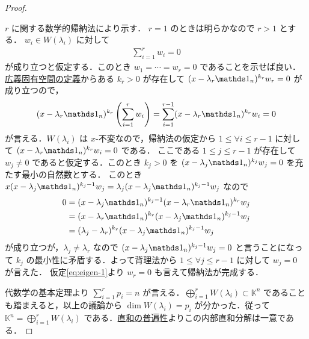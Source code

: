 \documentclass[rep_main]{subfiles}
\begin{document}
\begin{proof}
\begin{description}
        $r$ に関する数学的帰納法により示す．
        $r = 1$ のときは明らかなので $r > 1$ とする．
        $w_i \in W(\lambda_i)$ に対して
        \begin{align}
            \label{eq:eigen-1}
            \sum_{i=1}^r w_i = 0
        \end{align}
        が成り立つと仮定する．このとき $w_1 = \cdots = w_r = 0$ であることを示せば良い．
        \hyperref[def:eigen]{広義固有空間の定義}からある $k_r > 0$ が存在して $(x - \lambda_r \unity_n)^{k_r} w_r = 0$ が成り立つので，
        \begin{align}
            (x - \lambda_r \unity_n)^{k_r}\left(\sum_{i=1}^rw_i \right) = \sum_{i=1}^{r-1} (x - \lambda_r \unity_n)^{k_r}w_i = 0
        \end{align}
        が言える．$W(\lambda_i)$ は $x$-不変なので，帰納法の仮定から $1 \le \forall i \le r-1$ に対して $(x - \lambda_r \unity_n)^{k_r}w_i = 0$ である．
        ここである $1 \le j \le r-1$ が存在して $w_j \neq 0$ であると仮定する．このとき $k_j > 0$ を $(x - \lambda_j \unity_n)^{k_j} w_j = 0$ を充たす最小の自然数とする．
        このとき $x (x - \lambda_j \unity_n)^{k_j-1} w_j = \lambda_j (x - \lambda_j \unity_n)^{k_j-1} w_j$ なので
        \begin{align}
            0 
            &= (x - \lambda_j \unity_n)^{k_j-1} (x - \lambda_r \unity_n)^{k_r}w_j \\
            &= (x - \lambda_r \unity_n)^{k_r}(x - \lambda_j \unity_n)^{k_j-1} w_j \\
            &= (\lambda_j - \lambda_r)^{k_r}(x - \lambda_j \unity_n)^{k_j-1} w_j
        \end{align}
        が成り立つが，$\lambda_j \neq \lambda_r$ なので $(x - \lambda_j \unity_n)^{k_j-1} w_j = 0$ と言うことになって $k_j$ の最小性に矛盾する．よって背理法から $1 \le \forall j \le r-1$ に対して $w_j = 0$ が言えた．
        仮定\eqref{eq:eigen-1}より $w_r = 0$ も言えて帰納法が完成する．
    \end{description}

    代数学の基本定理より $\sum_{i=1}^r p_i = n$ が言える．$\bigoplus_{i=1}^r W(\lambda_i) \subset \mathbb{K}^n$ であることも踏まえると，以上の議論から $\dim W(\lambda_i) = p_i$ が分かった．従って $\mathbb{K}^n = \bigoplus_{i=1}^r W(\lambda_i)$ である．\hyperref[def:univ-vec-sum]{直和の普遍性}よりこの内部直和分解は一意である．
\end{proof}
\end{document}
